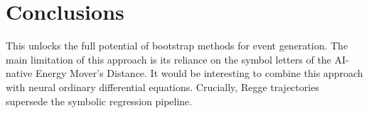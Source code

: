 \section{Conclusions}\label{sec:conclusions}

This unlocks the full potential of bootstrap methods for event
generation. The main limitation of this approach is its reliance on the
symbol letters of the AI-native Energy Mover's Distance. It would be
interesting to combine this approach with neural ordinary differential
equations. Crucially, Regge trajectories supersede the symbolic
regression pipeline.

